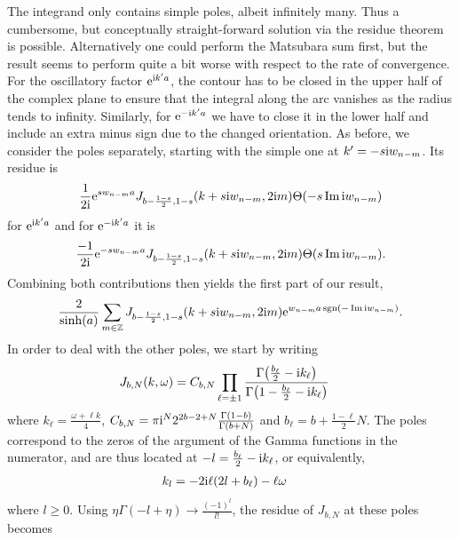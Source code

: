 The integrand only contains simple poles, albeit infinitely many.
Thus a cumbersome, but conceptually straight-forward solution via the residue theorem is possible.
Alternatively one could perform the Matsubara sum first, but the result seems to perform quite a bit worse with respect to the rate of convergence.
For the oscillatory factor $\powe{\i k'a}$, the contour has to be closed in the upper half of the complex plane to ensure that the integral along the arc vanishes as the radius tends to infinity.
Similarly, for $\powe{-\i k'a}$ we have to close it in the lower half and include an extra minus sign due to the changed orientation.
As before, we consider the poles separately, starting with the simple one at $k'=-s\i w_{n-m}$.
Its residue is
\begin{align*}
\frac{1}{2\i} \powe{sw_{n-m} a} J_{b-\frac{1-s}{2}, 1-s}(k+s\i w_{n-m}, 2\i m) \Theta\kla*{- s\Im \i w_{n-m}} 
\end{align*}
for $\powe{\i k'a}$ and for $\powe{-\i k'a}$ it is
\begin{align*}
\frac{-1}{2\i} \powe{-sw_{n-m} a} J_{b-\frac{1-s}{2}, 1-s}(k+s\i w_{n-m}, 2\i m) \Theta\kla*{s\Im \i w_{n-m}} .
\end{align*}
Combining both contributions then yields the first part of our result,
\begin{align*}
\frac{2}{\sinh(a)} \sum_{m\in\mathbb{Z}} J_{b-\frac{1-s}{2}, 1-s}(k+s\i w_{n-m}, 2\i m) \powe{w_{n-m} a \sgn(-\Im \i w_{n-m})}.
\end{align*}
In order to deal with the other poles, we start by writing
\begin{align*}
J_{b,N}(k,\omega) &= C_{b,N} \prod_{\ell=\pm 1} \frac{\Gamma\kla[\big]{\frac{b_\ell}{2} - \i k_\ell}}{\Gamma\kla[\big]{1 - \frac{b_\ell}{2} - \i k_\ell}}
\end{align*}
where $k_\ell = \frac{\omega + \ell k}{4}$, $C_{b,N} = \pi \i^N 2^{2b-2+N} \frac{\Gamma(1-b)}{\Gamma(b+N)}$ and $b_\ell = b + \frac{1 - \ell}{2}N$.
The poles correspond to the zeros of the argument of the Gamma functions in the numerator, and are thus located at $-l = \frac{b_\ell}{2} - \i k_\ell$, or equivalently,
\begin{align*}
k_l &= -2\i\ell (2l + b_\ell) - \ell\omega
\end{align*}
where $l\ge 0$.
Using $\eta \Gamma(-l+\eta) \rightarrow \frac{(-1)^l}{l!}$, the residue of $J_{b,N}$ at these poles becomes
